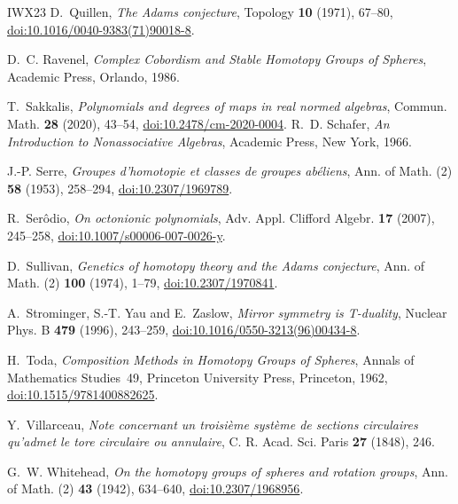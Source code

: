 \documentclass[11pt]{amsart}
\numberwithin{equation}{section}
\theoremstyle{plain}
\theoremstyle{definition}
\theoremstyle{remark}
\begin{document}
\begin{thebibliography}{IWX23}
 D.~Quillen, \emph{The Adams conjecture}, Topology \textbf{10} (1971), 67--80, \href{https://doi.org/10.1016/0040-9383(71)90018-8}{doi:10.1016/0040-9383(71)90018-8}.

 D.~C. Ravenel, \emph{Complex Cobordism and Stable Homotopy Groups of Spheres}, Academic Press, Orlando, 1986.

 T.~Sakkalis, \emph{Polynomials and degrees of maps in real normed algebras}, Commun. Math. \textbf{28} (2020), 43--54, \href{https://doi.org/10.2478/cm-2020-0004}{doi:10.2478/cm-2020-0004}.
 R.~D. Schafer, \emph{An Introduction to Nonassociative Algebras}, Academic Press, New York, 1966.

 J.-P. Serre, \emph{Groupes d'homotopie et classes de groupes ab\'eliens}, Ann. of Math. (2) \textbf{58} (1953), 258--294, \href{https://doi.org/10.2307/1969789}{doi:10.2307/1969789}.

 R.~Ser\^odio, \emph{On octonionic polynomials}, Adv. Appl. Clifford Algebr. \textbf{17} (2007), 245--258, \href{https://doi.org/10.1007/s00006-007-0026-y}{doi:10.1007/s00006-007-0026-y}.

 D.~Sullivan, \emph{Genetics of homotopy theory and the Adams conjecture}, Ann. of Math. (2) \textbf{100} (1974), 1--79, \href{https://doi.org/10.2307/1970841}{doi:10.2307/1970841}.

 A.~Strominger, S.-T. Yau and E.~Zaslow, \emph{Mirror symmetry is T-duality}, Nuclear Phys. B \textbf{479} (1996), 243--259, \href{https://doi.org/10.1016/0550-3213(96)00434-8}{doi:10.1016/0550-3213(96)00434-8}.

 H.~Toda, \emph{Composition Methods in Homotopy Groups of Spheres}, Annals of Mathematics Studies~49, Princeton University Press, Princeton, 1962, \href{https://doi.org/10.1515/9781400882625}{doi:10.1515/9781400882625}.

 Y.~Villarceau, \emph{Note concernant un troisi\`eme syst\`eme de sections circulaires qu'admet le tore circulaire ou annulaire}, C. R. Acad. Sci. Paris \textbf{27} (1848), 246.

 G.~W. Whitehead, \emph{On the homotopy groups of spheres and rotation groups}, Ann. of Math. (2) \textbf{43} (1942), 634--640, \href{https://doi.org/10.2307/1968956}{doi:10.2307/1968956}.

\end{thebibliography}
\endgroup
\end{document}
